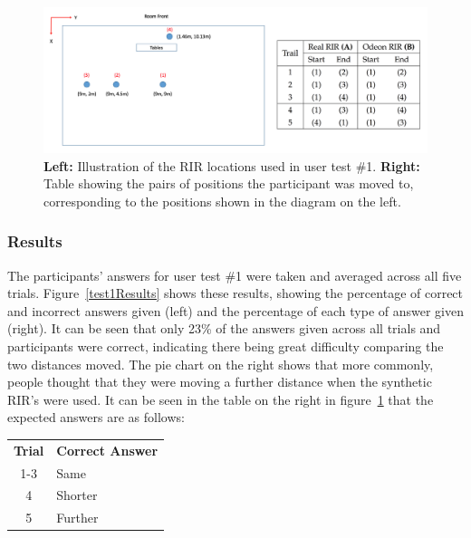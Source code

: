 \documentclass[../../main.tex]{subfiles}
\begin{document}
			\begin{figure}
				\centerline{\includegraphics[width=\textwidth]{Sections/userTesting/images/test1/roomPositionsandResults.png}}
				\caption{\textbf{Left:} Illustration of the \ac{RIR} locations used in user test \#1. \textbf{Right:} Table showing the pairs of positions the participant was moved to, corresponding to the positions shown in the diagram on the left.}
				\label{test1}
			\end{figure}		

		\subsubsection{Results}
			The participants' answers for user test \#1 were taken and averaged across all five trials. Figure~\ref{test1Results} shows these results, showing the percentage of correct and incorrect answers given (left) and the percentage of each type of answer given (right). It can be seen that only 23\% of the answers given across all trials and participants were correct, indicating there being great difficulty comparing the two distances moved. The pie chart on the right shows that more commonly, people thought that they were moving a further distance when the synthetic \ac{RIR}'s were used. It can be seen in the table on the right in figure~\ref{test1} that the expected answers are as follows:


			\begin{center}
			\begin{tabular}{c l}
			\textbf{Trial} & \textbf{Correct Answer} \\
			1-3 & Same \\
			4 & Shorter \\
			5 & Further
			\end{tabular}
			\end{center}
			\vspace{5mm}
\end{document}
